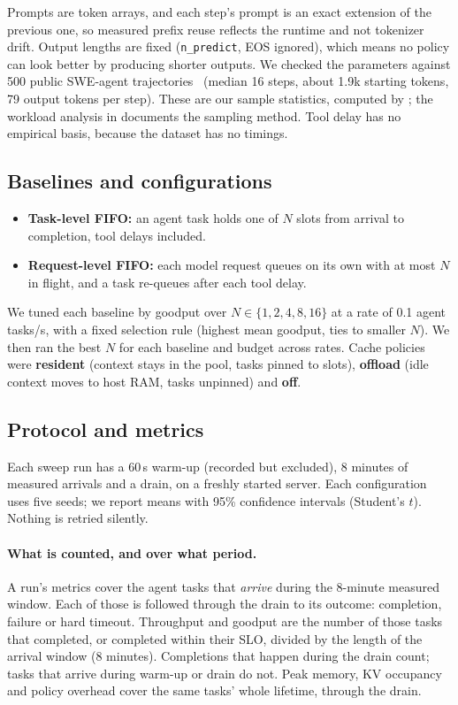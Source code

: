 Prompts are token arrays, and each step's prompt is an exact extension of the previous one, so measured prefix reuse reflects the runtime and not tokenizer drift. Output lengths are fixed (\texttt{n\_predict}, EOS ignored), which means no policy can look better by producing shorter outputs. We checked the parameters against 500 public SWE-agent trajectories~\cite{yang2024sweagent,nebius2024trajectories} (median 16 steps, about 1.9k starting tokens, 79 output tokens per step). These are our sample statistics, computed by ; the workload analysis in  documents the sampling method. Tool delay has no empirical basis, because the dataset has no timings.

\subsection{Baselines and configurations}\label{sec:baselines}

\begin{itemize}
  \item \textbf{Task-level FIFO:} an agent task holds one of $N$ slots from arrival to completion, tool delays included.
  \item \textbf{Request-level FIFO:} each model request queues on its own with at most $N$ in flight, and a task re-queues after each tool delay.
\end{itemize}

We tuned each baseline by goodput over $N \in \{1, 2, 4, 8, 16\}$ at a rate of 0.1 agent tasks/s, with a fixed selection rule (highest mean goodput, ties to smaller $N$). We then ran the best $N$ for each baseline and budget across rates. Cache policies were \textbf{resident} (context stays in the pool, tasks pinned to slots), \textbf{offload} (idle context moves to host RAM, tasks unpinned) and \textbf{off}.

\subsection{Protocol and metrics}\label{sec:protocol}

Each sweep run has a 60\,s warm-up (recorded but excluded), 8 minutes of measured arrivals and a drain, on a freshly started server. Each configuration uses five seeds; we report means with 95\% confidence intervals (Student's $t$). Nothing is retried silently.

\paragraph{What is counted, and over what period.} A run's metrics cover the agent tasks that \emph{arrive} during the 8-minute measured window. Each of those is followed through the drain to its outcome: completion, failure or hard timeout. Throughput and goodput are the number of those tasks that completed, or completed within their SLO, divided by the length of the arrival window (8 minutes). Completions that happen during the drain count; tasks that arrive during warm-up or drain do not. Peak memory, KV occupancy and policy overhead cover the same tasks' whole lifetime, through the drain.

